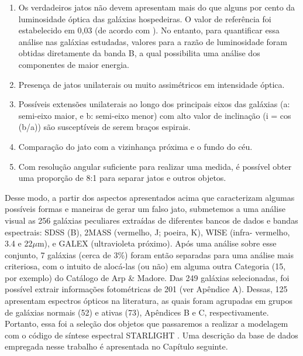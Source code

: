 \begin{enumerate}
    
\item Os verdadeiros jatos não devem apresentam mais do que alguns por cento da luminosidade óptica das galáxias hospedeiras. O valor de referência foi estabelecido em 0,03 (de acordo com \cite{keel1985recognition}). No entanto, para quantificar essa análise nas galáxias estudadas, valores para a razão de luminosidade foram obtidas diretamente da banda B, a qual possibilita uma análise dos componentes de maior energia.

\item Presença de jatos unilaterais ou muito assimétricos em intensidade óptica. 

\item Possíveis extensões unilaterais ao longo dos principais eixos das
galáxias (a: semi-eixo maior, e b: semi-eixo menor) com alto valor de inclinação (i = cos (b/a)) são susceptíveis de serem braços espirais.

\item Comparação do jato com a vizinhança próxima e o fundo do céu.

\item Com resolução angular suficiente para realizar uma medida, é possível obter uma proporção de 8:1\cite{keel1985recognition} para separar jatos e outros objetos.

\end{enumerate}

Desse modo, a partir dos aspectos apresentados acima que caracterizam algumas possíveis formas e maneiras de gerar um falso jato, submetemos a uma análise visual as 256 galáxias peculiares extraídas de diferentes bancos de dados e bandas espectrais: SDSS (B), 2MASS (vermelho, J; poeira, K), WISE (infra- vermelho, 3.4 e 22$\mu$m), e GALEX (ultravioleta próximo). Após uma análise sobre esse conjunto, 7 galáxias (cerca de 3\%) foram então separadas para uma análise mais criteriosa, com o intuito de alocá-las (ou não) em alguma outra Categoria (15, por exemplo) do Catálogo de Arp \& Madore. Das 249 galáxias selecionadas, foi possível extrair informações fotométricas de 201 (ver Apêndice A). Dessas, 125 apresentam espectros ópticos na literatura, as quais foram agrupadas em grupos de galáxias normais (52) e ativas (73), Apêndices B e C, respectivamente. Portanto, essa foi a seleção dos objetos que passaremos a realizar a modelagem com o código de síntese espectral STARLIGHT \cite{cid2004star,fernandes2005semi,asari2007history}. Uma descrição da base de dados empregada nesse trabalho é apresentada no Capítulo seguinte.